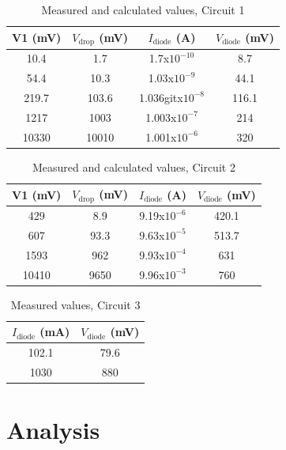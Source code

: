\documentclass[12pt,letterpaper]{report}
\begin{document}
\begin{table}[ht]
\caption{Measured and calculated values, Circuit 1} %
\centering 
    \begin{tabular}{| c | c | c | c |}
    \hline  
    V1 (mV) & $V_{\text{drop}}$ (mV) & $I_{\text{diode}}$ (A) & $V_{\text{diode}}$ (mV) \\
    \hline
    10.4 & 1.7 & 1.7x$10^{-10}$ & 8.7 \\
    54.4 & 10.3 & 1.03x$10^{-9}$ & 44.1\\
    219.7 & 103.6 & 1.036gitx$10^{-8}$ & 116.1\\
    1217 & 1003 & 1.003x$10^{-7}$ & 214\\
    10330 & 10010 & 1.001x$10^{-6}$ & 320\\
    \hline
    \end{tabular}
    \label{table:circuit_1}
\end{table}

\begin{table}[ht]
\caption{Measured and calculated values, Circuit 2} %
\centering 
    \begin{tabular}{| c | c | c | c |}
    \hline  
    V1 (mV) & $V_{\text{drop}}$ (mV) & $I_{\text{diode}}$ (A) & $V_{\text{diode}}$ (mV) \\
    \hline
    429 & 8.9 & 9.19x$10^{-6}$ & 420.1 \\
    607 & 93.3 & 9.63x$10^{-5}$ & 513.7\\
    1593 & 962 & 9.93x$10^{-4}$ & 631\\
    10410 & 9650 & 9.96x$10^{-3}$ & 760\\
    \hline
    \end{tabular}
    \label{table:circuit_2}
\end{table}

\begin{table}[ht]
\caption{Measured values, Circuit 3} %
\centering 
    \begin{tabular}{| c | c |}
    \hline  
    $I_{\text{diode}}$ (mA) & $V_{\text{diode}}$ (mV) \\
    \hline
    102.1 & 79.6 \\
    1030 & 880\\
    \hline
    \end{tabular}
    \label{table:circuit_3}
\end{table}

\section*{Analysis}
\end{document}
